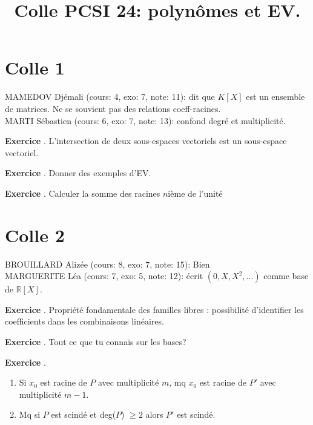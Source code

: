 \documentclass[10pt,a4paper]{article}
\title{Colle PCSI 24: polynômes et EV.}
\newcounter{question}
\newcounter{exo}
\newenvironment{exo}{\vspace{0.5cm}\setcounter{question}{0}\addtocounter{exo}{1} \noindent \textbf{Exercice \theexo}. \normalsize }{\par}
\begin{document}
	\maketitle
	
	
	\section*{Colle 1}
	\setcounter{exo}{0}
	MAMEDOV Djémali (cours: 4, exo: 7, note: 11): dit que $K[X]$ est un ensemble de matrices. Ne se souvient pas des relations coeff-racines.\\
	MARTI Sébastien (cours: 6, exo: 7, note: 13): confond degré et multiplicité. 
	
	\begin{exo}
		 L'intersection de deux sous-espaces vectoriels est un sous-espace vectoriel. 
	\end{exo}

	\begin{exo}
		Donner des exemples d'EV.
	\end{exo}
	
	\begin{exo}
		Calculer la somme des racines $n$ième de l'unité
	\end{exo}	
	
	
	\section*{Colle 2}
	\setcounter{exo}{0}
	BROUILLARD Alizée (cours: 8, exo: 7, note: 15): Bien\\
	MARGUERITE Léa (cours: 7, exo: 5, note: 12): écrit $(0, X, X^2, ...)$ comme base de $\mathbb{R}[X]$.\\
			
	\begin{exo}
		 Propriété fondamentale des familles libres : possibilité d'identifier les coefficients dans les combinaisons linéaires. 
	\end{exo}		

	\begin{exo}
		Tout ce que tu connais sur les bases?
	\end{exo}

	\begin{exo}
		\begin{enumerate}
			\item Si $x_0$ est racine de $P$ avec multiplicité $m$, mq $x_0$ est racine de $P'$ avec multiplicité $m - 1$.
			\item Mq si $P$ est scindé et deg($P$) $\geq 2$ alors $P'$ est scindé.
		\end{enumerate}
	\end{exo}
\end{document}
